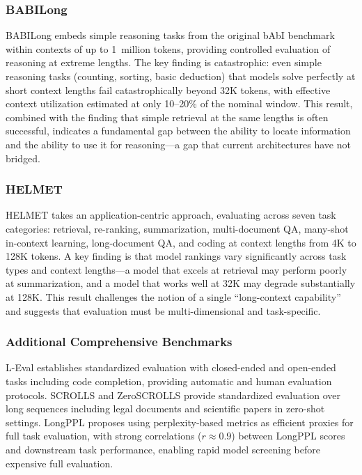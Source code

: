 \documentclass[11pt,letterpaper]{article}
\begin{document}
\subsubsection{BABILong}

BABILong \cite{kuratov2024babilong} embeds simple reasoning tasks from the original bAbI benchmark within contexts of up to 1~million tokens, providing controlled evaluation of reasoning at extreme lengths. The key finding is catastrophic: even simple reasoning tasks (counting, sorting, basic deduction) that models solve perfectly at short context lengths fail catastrophically beyond 32K tokens, with effective context utilization estimated at only 10--20\% of the nominal window. This result, combined with the finding that simple retrieval at the same lengths is often successful, indicates a fundamental gap between the ability to locate information and the ability to use it for reasoning---a gap that current architectures have not bridged.

\subsubsection{HELMET}

HELMET \cite{yen2024helmet} takes an application-centric approach, evaluating across seven task categories: retrieval, re-ranking, summarization, multi-document QA, many-shot in-context learning, long-document QA, and coding at context lengths from 4K to 128K tokens. A key finding is that model rankings vary significantly across task types and context lengths---a model that excels at retrieval may perform poorly at summarization, and a model that works well at 32K may degrade substantially at 128K. This result challenges the notion of a single ``long-context capability'' and suggests that evaluation must be multi-dimensional and task-specific.

\subsubsection{Additional Comprehensive Benchmarks}

L-Eval \cite{an2024leval} establishes standardized evaluation with closed-ended and open-ended tasks including code completion, providing automatic and human evaluation protocols. SCROLLS \cite{shaham2022scrolls} and ZeroSCROLLS \cite{shaham2023zeroscrolls} provide standardized evaluation over long sequences including legal documents and scientific papers in zero-shot settings. LongPPL proposes using perplexity-based metrics as efficient proxies for full task evaluation, with strong correlations ($r \approx 0.9$) between LongPPL scores and downstream task performance, enabling rapid model screening before expensive full evaluation.
\end{document}
